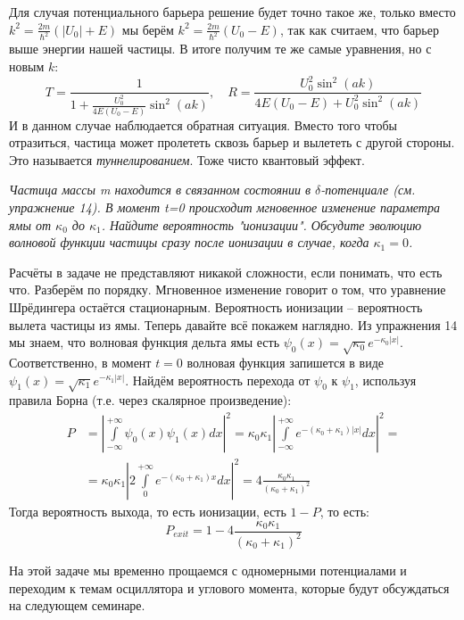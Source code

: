 Для случая потенциального барьера решение будет точно такое же, только вместо $ k^2 = \frac{2m}{\hbar^2}(|U_0| + E)$ мы берём $k^2 = \frac{2m}{\hbar^2}(U_0 - E)$, так как считаем, что барьер выше энергии нашей частицы. В итоге получим те же самые уравнения, но с новым $k$:
\[
T = \frac{1}{1 + \frac{U_0^2}{4E(U_0 - E)}\sin^2 (ak)},\quad R = \frac{U_0^2 \sin^2(ak)}{4E(U_0 - E) + U_0^2 \sin^2(ak)}
\]
И в данном случае наблюдается обратная ситуация. Вместо того чтобы отразиться, частица может пролететь сквозь барьер и вылететь с другой стороны. Это называется \textit{туннелированием}. Тоже чисто квантовый эффект.
\begin{center}
    \textit{Частица массы m находится в связанном состоянии в $\delta$-потенциале (см. упражнение 14). В момент t=0 происходит мгновенное изменение параметра ямы от $\kappa_0$ до $\kappa_1$. Найдите вероятность "ионизации". Обсудите эволюцию волновой функции частицы сразу после ионизации в случае, когда $\kappa_1=0$.}
\end{center}

Расчёты в задаче не представляют никакой сложности, если понимать, что есть что. Разберём по порядку. Мгновенное изменение говорит о том, что уравнение Шрёдингера остаётся стационарным. Вероятность ионизации – вероятность вылета частицы из ямы. Теперь давайте всё покажем наглядно. Из упражнения 14 мы знаем, что волновая функция дельта ямы есть $\psi_0(x) = \sqrt{\kappa_0}e^{-\kappa_0 |x|}$. Соответственно, в момент $t=0$ волновая функция запишется в виде $\psi_1(x) = \sqrt{\kappa_1}e^{-\kappa_1 |x|}$. Найдём вероятность перехода от $\psi_0$ к $\psi_1$, используя правила Борна (т.е. через скалярное произведение):
\begin{align*}
P &= \left|\int\limits_{-\infty}^{+\infty}\psi_0(x)\psi_1(x)dx\right|^2 = \kappa_0\kappa_1\left|\int\limits_{-\infty}^{+\infty} e^{-(\kappa_0 + \kappa_1)|x|}dx\right|^2 =\\
&= \kappa_0\kappa_1\left|2\int\limits_{0}^{+\infty} e^{-(\kappa_0 + \kappa_1)x}dx\right|^2 = 4\frac{\kappa_0\kappa_1}{(\kappa_0 + \kappa_1)^2}
\end{align*}
Тогда вероятность выхода, то есть ионизации, есть $1 - P$, то есть:
\[
P_{exit} = 1 - 4\frac{\kappa_0\kappa_1}{(\kappa_0 + \kappa_1)^2}
\]

На этой задаче мы временно прощаемся с одномерными потенциалами и переходим к темам осциллятора и углового момента, которые будут обсуждаться на следующем семинаре. 
